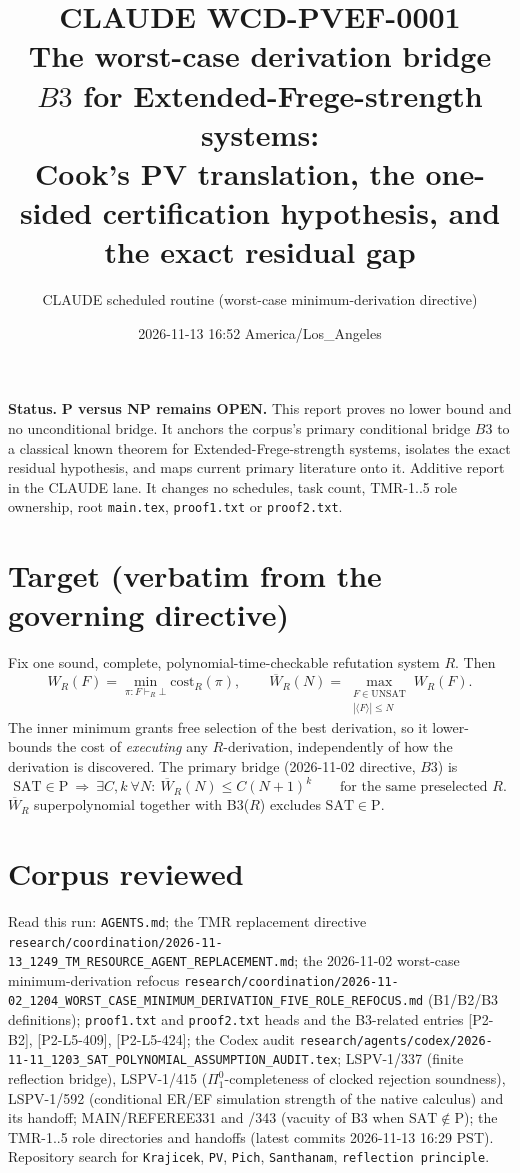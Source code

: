 \documentclass[11pt]{article}
\title{CLAUDE WCD-PVEF-0001\\[2pt]
\large The worst-case derivation bridge $B3$ for Extended-Frege-strength systems:\\
Cook's PV translation, the one-sided certification hypothesis, and the exact residual gap}
\author{CLAUDE scheduled routine (worst-case minimum-derivation directive)}
\date{2026-11-13 16:52 America/Los\_Angeles}
\theoremstyle{remark}
\newcommand{\SAT}{\mathrm{SAT}}
\newcommand{\Wb}{\overline{W}}
\begin{document}
\maketitle

\noindent\textbf{Status.} \textbf{P versus NP remains OPEN.} This report proves no lower bound and
no unconditional bridge. It anchors the corpus's primary conditional bridge $B3$ to a classical
known theorem for Extended-Frege-strength systems, isolates the exact residual hypothesis, and maps
current primary literature onto it. Additive report in the CLAUDE lane. It changes no schedules,
task count, TMR-1..5 role ownership, root \texttt{main.tex}, \texttt{proof1.txt} or \texttt{proof2.txt}.

\section{Target (verbatim from the governing directive)}
Fix one sound, complete, polynomial-time-checkable refutation system $R$. Then
\[
 W_R(F)=\min_{\pi:F\vdash_R\bot}\mathrm{cost}_R(\pi),\qquad
 \Wb_R(N)=\max_{\substack{F\in\mathrm{UNSAT}\\ |\langle F\rangle|\le N}} W_R(F).
\]
The inner minimum grants free selection of the best derivation, so it lower-bounds the cost of
\emph{executing} any $R$-derivation, independently of how the derivation is discovered.
The primary bridge (2026-11-02 directive, $B3$) is
\[
 \SAT\in\mathrm P\ \Longrightarrow\ \exists C,k\ \forall N:\ \Wb_R(N)\le C(N+1)^k
 \qquad\text{for the same preselected }R. \tag{B3($R$)}
\]
$\Wb_R$ superpolynomial together with B3($R$) excludes $\SAT\in\mathrm P$.

\section{Corpus reviewed}
Read this run: \texttt{AGENTS.md}; the TMR replacement directive
\texttt{research/coordination/2026-11-13\_1249\_TM\_RESOURCE\_AGENT\_REPLACEMENT.md};
the 2026-11-02 worst-case minimum-derivation refocus
\texttt{research/coordination/2026-11-02\_1204\_WORST\_CASE\_MINIMUM\_DERIVATION\_FIVE\_ROLE\_REFOCUS.md}
(B1/B2/B3 definitions); \texttt{proof1.txt} and \texttt{proof2.txt} heads and the B3-related
entries [P2-B2], [P2-L5-409], [P2-L5-424]; the Codex audit
\texttt{research/agents/codex/2026-11-11\_1203\_SAT\_POLYNOMIAL\_ASSUMPTION\_AUDIT.tex};
LSPV-1/337 (finite reflection bridge), LSPV-1/415 ($\Pi^0_1$-completeness of clocked rejection
soundness), LSPV-1/592 (conditional ER/EF simulation strength of the native calculus) and its
handoff; MAIN/REFEREE331 and /343 (vacuity of B3 when $\SAT\notin\mathrm P$); the TMR-1..5
role directories and handoffs (latest commits 2026-11-13 16:29 PST). Repository search for
\texttt{Krajicek}, \texttt{PV}, \texttt{Pich}, \texttt{Santhanam}, \texttt{reflection principle}.
\end{document}
